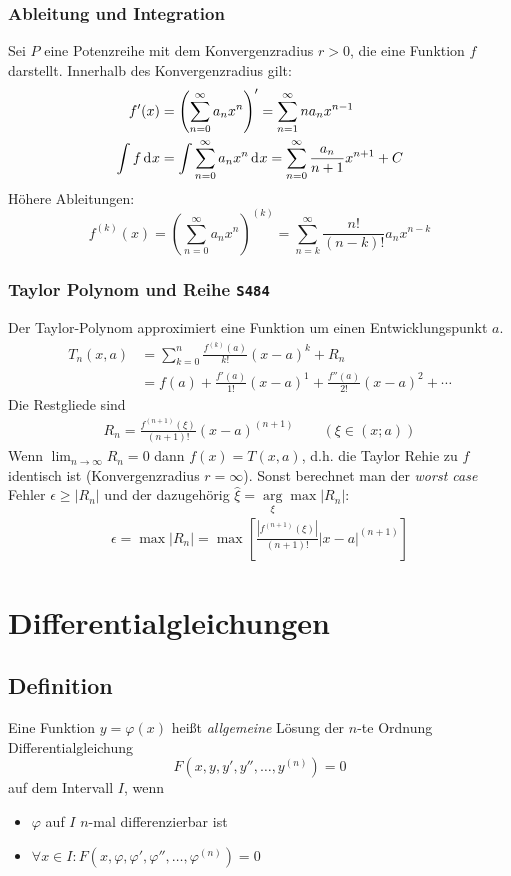 \documentclass[margin=small, twocolumn]{hsrzf}
\numberwithin{equation}{subsection}
\newcommand{\brpage}[1]{\textcolor{red!70!black}{\small\texttt{S#1}}}
\begin{document}
\subsubsection{Ableitung und Integration}
Sei \(P\) eine Potenzreihe mit dem Konvergenzradius \(r > 0\), die eine Funktion \(f\) darstellt. Innerhalb des Konvergenzradius gilt:
\begin{align*}
    f'(x) &= \left(\sum_{n=0}^\infty a_n x^n \right)' 
        = \sum_{n=1}^\infty n a_n x^{n-1} \\
    \int f \,\mathrm{d}^{} x &= \int \sum_{n=0}^\infty a_n x^n \,\mathrm{d}^{} x
        = \sum_{n=0}^\infty \frac{a_n}{n+1} x^{n+1} + C
\end{align*}
H\"ohere Ableitungen:
\[
    f^{(k)}(x) = \left(\sum_{n=0}^\infty a_n x^n \right)^{(k)} 
    = \sum_{n=k}^\infty \frac{n!}{(n-k)!} a_n x^{n-k}
\]

\subsubsection{Taylor Polynom und Reihe \brpage{484}}
Der Taylor-Polynom approximiert eine Funktion um einen Entwicklungspunkt \(a\).
\begin{align*}
  T_n(x, a) &= \sum_{k=0}^n\frac{f^{(k)}(a)}{k!}(x-a)^k + R_n\\
  &= f(a) + \frac{f'(a)}{1!}(x-a)^1 + \frac{f''(a)}{2!}(x-a)^2 + \cdots
\end{align*}
Die Restgliede sind
\begin{align*}
  R_n = \frac{f^{(n+1)}(\xi)}{(n+1)!} (x-a)^{(n+1)} \qquad (\xi \in (x;a))
\end{align*}
Wenn \(\lim_{n\to\infty}R_n = 0\) dann \(f(x) = T(x,a)\), d.h. die Taylor Rehie zu \(f\) identisch ist (Konvergenzradius \(r = \infty\)). Sonst berechnet man der \emph{worst case} Fehler \(\epsilon \geq |R_n|\) und der dazugeh\"orig \(\hat{\xi} = \underset{\xi}{\arg}\max|R_n|\):
\begin{align*}
  \epsilon
  = \max |R_n|
  = \max \left[\frac{|f^{(n+1)}(\xi)|}{(n+1)!} |x-a|^{(n+1)}\right]
\end{align*}


\section{Differentialgleichungen}
\subsection{Definition}
Eine Funktion \(y = \varphi(x)\) hei{\ss}t \emph{allgemeine} L\"osung der \(n\)-te Ordnung Differentialgleichung
\[
    F(x, y, y', y'', \dots, y^{(n)}) = 0
\]
auf dem Intervall \(I\), wenn
\begin{itemize}
    \item \(\varphi\) auf \(I\) \(n\)-mal differenzierbar ist
    \item \(\forall x \in I: F(x, \varphi, \varphi', \varphi'', \dots, \varphi^{(n)}) = 0\)
\end{itemize}
\end{document}
